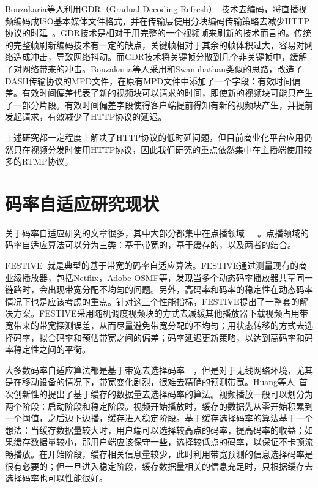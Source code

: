 Bouzakaria等人利用GDR（Gradual Decoding Refresh）~\cite{hannuksela2003random}技术去编码，将直播视频编码成ISO基本媒体文件格式，并在传输层使用分块编码传输策略去减少HTTP协议的时延~\cite{bouzakaria2014overhead}。GDR技术是相对于用完整的一个视频帧来刷新的技术而言的。传统的完整帧刷新编码技术有一定的缺点，关键帧相对于其余的帧体积过大，容易对网络造成冲击，导致网络抖动。而GDR技术将关键帧分散到几个非关键帧中，缓解了对网络带来的冲击。Bouzakaria等人采用和Swanubathan类似的思路，改造了DASH传输协议的MPD文件，在原有MPD文件中添加了一个字段：有效时间偏差。有效时间偏差代表了新的视频块可以请求的时间，即使新的视频块可能只产生了一部分片段。有效时间偏差字段使得客户端提前得知有新的视频块产生，并提前发起请求，有效减少了HTTP协议的延迟。

上述研究都一定程度上解决了HTTP协议的低时延问题，但目前商业化平台应用仍然只在视频分发时使用HTTP协议，因此我们研究的重点依然集中在主播端使用较多的RTMP协议。

\section{码率自适应研究现状}
关于码率自适应研究的文章很多，其中大部分都集中在点播领域~\cite{mao2017neural}~\cite{akhshabi2011experimental}~\cite{petrangeli2016qoe}。点播领域的码率自适应算法可以分为三类：基于带宽的，基于缓存的，以及两者的结合。

FESTIVE~\cite{jiang2014improving}就是典型的基于带宽的码率自适应算法。FESTIVE通过测量现有的商业级播放器，包括Netflix，Adobe OSMF等，发现当多个动态码率播放器共享同一链路时，会出现带宽分配不均匀的问题。另外，高码率和码率的稳定性在动态码率情况下也是应该考虑的重点。针对这三个性能指标，FESTIVE提出了一整套的解决方案。FESTIVE采用随机调度视频块的方式去减缓其他播放器下载视频占用带宽带来的带宽探测误差，从而尽量避免带宽分配的不均匀；用状态转移的方式去选择码率，拟合码率和预估带宽之间的偏差；码率延迟更新策略，以达到高码率和码率稳定性之间的平衡。

大多数码率自适应算法都是基于带宽去选择码率~\cite{li2014probe}~\cite{akhshabi2012happens}，但是对于无线网络环境，尤其是在移动设备的情况下，带宽变化剧烈，很难去精确的预测带宽。Huang等人~\cite{huang2015buffer}首次创新性的提出了基于缓存的数据量去选择码率的算法。视频播放一般可以划分为两个阶段：启动阶段和稳定阶段。视频开始播放时，缓存的数据先从零开始积累到一个阈值，之后边下边播，缓存进入稳定阶段。基于缓存选择码率的算法基于一个想法：当缓存数据量较大时，用户端可以选择较高点的码率，提高码率的收益；如果缓存数据量较小，那用户端应该保守一些，选择较低点的码率，以保证不卡顿流畅播放。在开始阶段，缓存相关信息量较少，此时利用带宽预测的信息选择码率是很有必要的；但一旦进入稳定阶段，缓存数据量相关的信息充足时，只根据缓存去选择码率也可以性能很好。

